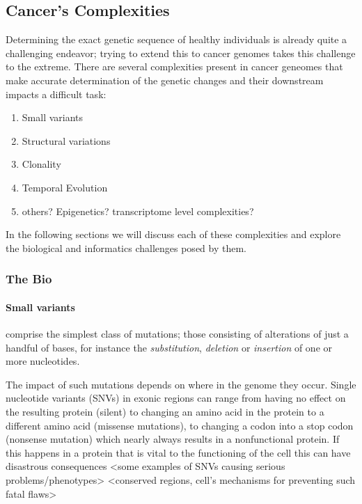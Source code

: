 \subsection{Cancer's Complexities}

Determining the exact genetic sequence of healthy individuals is already quite a challenging endeavor; trying to extend this to cancer genomes takes this challenge to the extreme. There are several complexities present in cancer geneomes that make accurate determination of the genetic changes and their downstream impacts a difficult task:

\begin{enumerate}
    \itemsep-0.5em
    \item Small variants
    \item Structural variations
    \item Clonality
    \item Temporal Evolution
    \item others? Epigenetics? transcriptome level complexities?
\end{enumerate}

In the following sections we will discuss each of these complexities and explore the biological and informatics challenges posed by them.

\subsubsection{The Bio}
\paragraph{Small variants} comprise the simplest class of mutations; those consisting of alterations of just a handful of bases, for instance the \emph{substitution}, \emph{deletion} or \emph{insertion} of one or more nucleotides.

The impact of such mutations depends on where in the genome they occur. Single nucleotide variants (SNVs) in exonic regions can range from having no effect on the resulting protein (silent) to changing an amino acid in the protein to a different amino acid (missense mutations), to changing a codon into a stop codon (nonsense mutation) which nearly always results in a nonfunctional protein. If this happens in a protein that is vital to the functioning of the cell this can have disastrous consequences <some examples of SNVs causing serious problems/phenotypes> <conserved regions, cell's mechanisms for preventing such fatal flaws>

